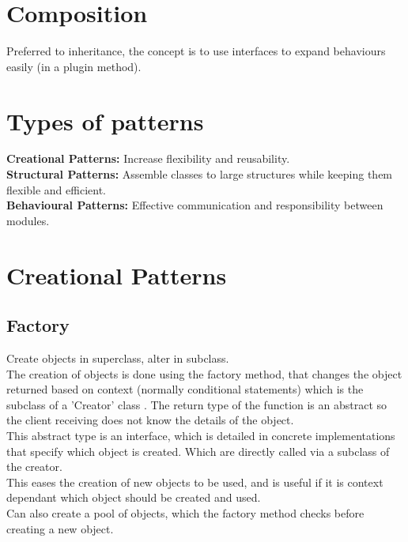 \documentclass[11pt]{scrartcl} %
\begin{document}
\section{Composition}

Preferred to inheritance, the concept is to use interfaces to expand behaviours easily 
(in a plugin method).

\section{Types of patterns}

\textbf{Creational Patterns:} Increase flexibility and reusability.\\

\textbf{Structural Patterns:} Assemble classes to large structures while keeping them flexible and
efficient.\\

\textbf{Behavioural Patterns:} Effective communication and responsibility between modules.

\section{Creational Patterns}

\subsection{Factory}

Create objects in superclass, alter in subclass.\\

The creation of objects is done using the factory method, that changes the 
object returned based on context (normally conditional statements) which is the subclass of a 'Creator' class
. The return type of the function is an abstract so the client receiving 
does not know the details of the object.\\

This abstract type is an interface, which is detailed in concrete implementations that specify
which object is created. Which are directly called via a subclass of the creator. \\

This eases the creation of new objects to be used, and is useful if it is context dependant which
object should be created and used. \\

Can also create a pool of objects, which the factory method checks before creating a new object.\\
\end{document}
